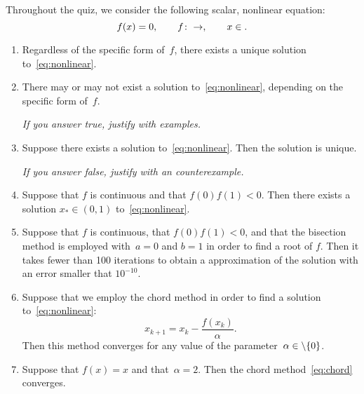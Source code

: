 \documentclass{article}
\begin{document}
    Throughout the quiz, we consider the following scalar, nonlinear equation:
    \begin{equation}
        \label{eq:nonlinear}
        f(x) = 0,
        \qquad f\colon \real \to \real,
        \qquad x \in \real.
    \end{equation}

\begin{enumerate}

    \item
        Regardless of the specific form of~$f$,
        there exists a unique solution to~\eqref{eq:nonlinear}.

    \item
        There may or may not exist a solution to~\eqref{eq:nonlinear},
        depending on the specific form of~$f$.

        \emph{If you answer true, justify with examples.}
        \vspace{1cm}

    \item
        Suppose there exists a solution to~\eqref{eq:nonlinear}.
        Then the solution is unique.

        \emph{If you answer false, justify with an counterexample.}
        \vspace{1cm}

    \item
        Suppose that $f$ is continuous and that $f(0) f(1) < 0$.
        Then there exists a solution $x_* \in (0, 1)$ to~\eqref{eq:nonlinear}.

    \item
        Suppose that $f$ is continuous, that $f(0) f(1) < 0$,
        and that the bisection method is employed with~$a = 0$ and $b = 1$ in order to find a root of $f$.
        Then it takes fewer than 100 iterations to obtain a approximation of the solution with an error smaller that $10^{-10}$.

    \item
        Suppose that we employ the chord method in order to find a solution to~\eqref{eq:nonlinear}:
        \begin{equation}
            \label{eq:chord}
            x_{k+1} = x_k - \frac{f(x_k)}{\alpha}.
        \end{equation}
        Then this method converges for any value of the parameter~$\alpha \in \real \setminus \{0\}$.

    \item
        Suppose that $f(x) = x$ and that~$\alpha = 2$.
        Then the chord method~\eqref{eq:chord} converges.


\end{enumerate}
\end{document}
